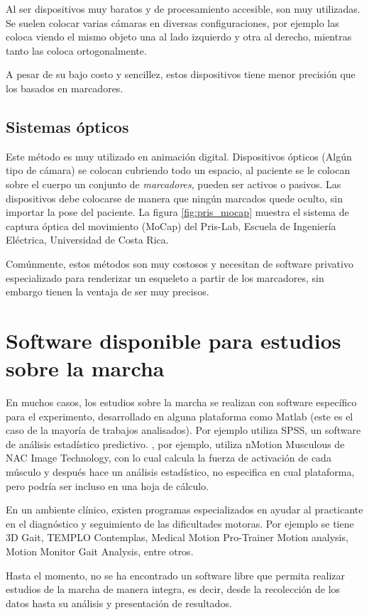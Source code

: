 Al ser dispositivos muy baratos y de procesamiento accesible, son muy utilizadas. Se suelen colocar varias cámaras en diversas configuraciones, por ejemplo \cite{hoang} las coloca viendo el mismo objeto una al lado izquierdo y otra al derecho, mientras tanto \cite{li} las coloca ortogonalmente. 

A pesar de su bajo costo y sencillez, estos dispositivos tiene menor precisión que los basados en marcadores.

\subsection{Sistemas ópticos}

Este método es muy utilizado en animación digital. Dispositivos ópticos (Algún tipo de cámara) se colocan cubriendo todo un espacio, al paciente se le colocan sobre el cuerpo un conjunto de \emph{marcadores}, pueden ser activos o pasivos. Las dispositivos debe colocarse de manera que ningún marcados quede oculto, sin importar la pose del paciente. La figura \ref{fig:pris_mocap} muestra el sistema de captura óptica del movimiento (MoCap) del Pris-Lab, Escuela de Ingeniería Eléctrica, Universidad de Costa Rica. 

Comúnmente, estos métodos son muy costosos y necesitan de software privativo especializado para renderizar un esqueleto a partir de los marcadores, sin embargo tienen la ventaja de ser muy precisos. 

\section[Software disponible]{Software disponible para estudios sobre la marcha}

En muchos casos, los estudios sobre la marcha se realizan con software específico para el experimento, desarrollado en alguna plataforma como Matlab (este es el caso de la mayoría de trabajos analisados). Por ejemplo \cite{menz} utiliza SPSS, un software de análisis estadístico predictivo. \cite{takahiro}, por ejemplo, utiliza nMotion Musculous de NAC Image Technology, con lo cual calcula la fuerza de activación de cada músculo y después hace un análisis estadístico, no especifica en cual plataforma, pero podría ser incluso en una hoja de cálculo. 

En un ambiente clínico, existen programas especializados en ayudar al practicante en el diagnóstico y seguimiento de las dificultades motoras. Por ejemplo se tiene 3D Gait, TEMPLO Contemplas, Medical Motion Pro-Trainer Motion analysis, Motion Monitor Gait Analysis, entre otros.  

Hasta el momento, no se ha encontrado un software libre que permita realizar estudios de la marcha de manera integra, es decir, desde la recolección de los datos hasta su análisis y presentación de resultados. 


